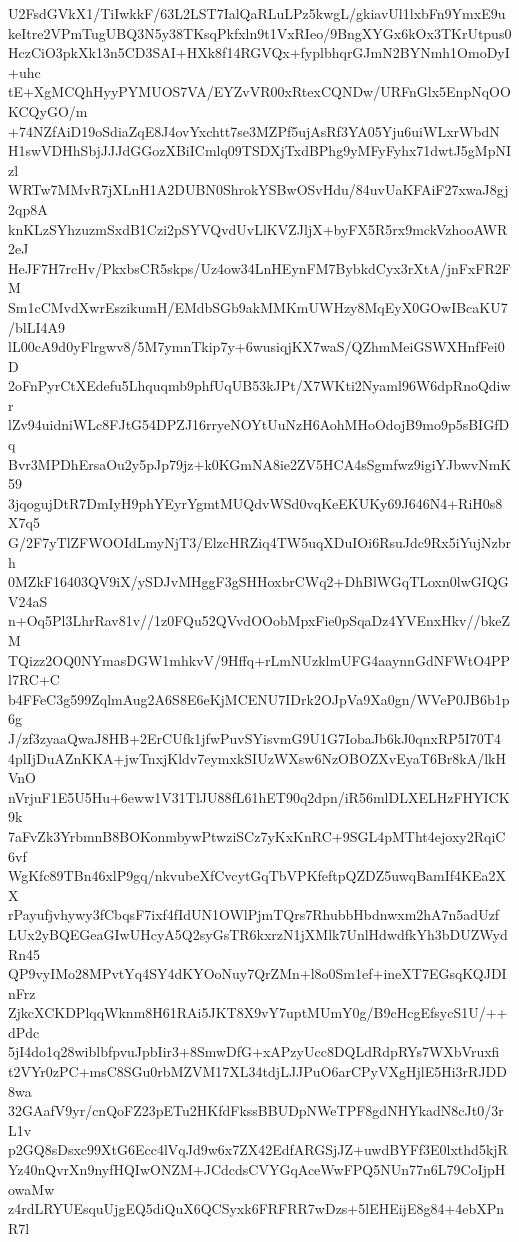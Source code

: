 U2FsdGVkX1/TiIwkkF/63L2LST7IalQaRLuLPz5kwgL/gkiavUl1lxbFn9YmxE9u
keItre2VPmTugUBQ3N5y38TKsqPkfxln9t1VxRIeo/9BngXYGx6kOx3TKrUtpus0
HczCiO3pkXk13n5CD3SAI+HXk8f14RGVQx+fyplbhqrGJmN2BYNmh1OmoDyI+uhc
tE+XgMCQhHyyPYMUOS7VA/EYZvVR00xRtexCQNDw/URFnGlx5EnpNqOOKCQyGO/m
+74NZfAiD19oSdiaZqE8J4ovYxchtt7se3MZPf5ujAsRf3YA05Yju6uiWLxrWbdN
H1swVDHhSbjJJJdGGozXBiICmlq09TSDXjTxdBPhg9yMFyFyhx71dwtJ5gMpNIzl
WRTw7MMvR7jXLnH1A2DUBN0ShrokYSBwOSvHdu/84uvUaKFAiF27xwaJ8gj2qp8A
knKLzSYhzuzmSxdB1Czi2pSYVQvdUvLlKVZJljX+byFX5R5rx9mckVzhooAWR2eJ
HeJF7H7rcHv/PkxbsCR5skps/Uz4ow34LnHEynFM7BybkdCyx3rXtA/jnFxFR2FM
Sm1cCMvdXwrEszikumH/EMdbSGb9akMMKmUWHzy8MqEyX0GOwIBcaKU7/blLI4A9
lL00cA9d0yFlrgwv8/5M7ymnTkip7y+6wusiqjKX7waS/QZhmMeiGSWXHnfFei0D
2oFnPyrCtXEdefu5Lhquqmb9phfUqUB53kJPt/X7WKti2Nyaml96W6dpRnoQdiwr
lZv94uidniWLc8FJtG54DPZJ16rryeNOYtUuNzH6AohMHoOdojB9mo9p5sBIGfDq
Bvr3MPDhErsaOu2y5pJp79jz+k0KGmNA8ie2ZV5HCA4sSgmfwz9igiYJbwvNmK59
3jqogujDtR7DmIyH9phYEyrYgmtMUQdvWSd0vqKeEKUKy69J646N4+RiH0s8X7q5
G/2F7yTlZFWOOIdLmyNjT3/ElzcHRZiq4TW5uqXDuIOi6RsuJdc9Rx5iYujNzbrh
0MZkF16403QV9iX/ySDJvMHggF3gSHHoxbrCWq2+DhBlWGqTLoxn0lwGIQGV24aS
n+Oq5Pl3LhrRav81v//1z0FQu52QVvdOOobMpxFie0pSqaDz4YVEnxHkv//bkeZM
TQizz2OQ0NYmasDGW1mhkvV/9Hffq+rLmNUzklmUFG4aaynnGdNFWtO4PPl7RC+C
b4FFeC3g599ZqlmAug2A6S8E6eKjMCENU7IDrk2OJpVa9Xa0gn/WVeP0JB6b1p6g
J/zf3zyaaQwaJ8HB+2ErCUfk1jfwPuvSYisvmG9U1G7IobaJb6kJ0qnxRP5I70T4
4plIjDuAZnKKA+jwTnxjKldv7eymxkSIUzWXsw6NzOBOZXvEyaT6Br8kA/lkHVnO
nVrjuF1E5U5Hu+6eww1V31TlJU88fL61hET90q2dpn/iR56mlDLXELHzFHYICK9k
7aFvZk3YrbmnB8BOKonmbywPtwziSCz7yKxKnRC+9SGL4pMTht4ejoxy2RqiC6vf
WgKfc89TBn46xlP9gq/nkvubeXfCvcytGqTbVPKfeftpQZDZ5uwqBamIf4KEa2XX
rPayufjvhywy3fCbqsF7ixf4fIdUN1OWlPjmTQrs7RhubbHbdnwxm2hA7n5adUzf
LUx2yBQEGeaGIwUHcyA5Q2syGsTR6kxrzN1jXMlk7UnlHdwdfkYh3bDUZWydRn45
QP9vyIMo28MPvtYq4SY4dKYOoNuy7QrZMn+l8o0Sm1ef+ineXT7EGsqKQJDInFrz
ZjkcXCKDPlqqWknm8H61RAi5JKT8X9vY7uptMUmY0g/B9cHcgEfsycS1U/++dPdc
5jI4do1q28wiblbfpvuJpbIir3+8SmwDfG+xAPzyUcc8DQLdRdpRYs7WXbVruxfi
t2VYr0zPC+msC8SGu0rbMZVM17XL34tdjLJJPuO6arCPyVXgHjlE5Hi3rRJDD8wa
32GAafV9yr/cnQoFZ23pETu2HKfdFkssBBUDpNWeTPF8gdNHYkadN8cJt0/3rL1v
p2GQ8sDsxc99XtG6Ecc4lVqJd9w6x7ZX42EdfARGSjJZ+uwdBYFf3E0lxthd5kjR
Yz40nQvrXn9nyfHQIwONZM+JCdcdsCVYGqAceWwFPQ5NUn77n6L79CoIjpHowaMw
z4rdLRYUEsquUjgEQ5diQuX6QCSyxk6FRFRR7wDzs+5lEHEijE8g84+4ebXPnR7l
